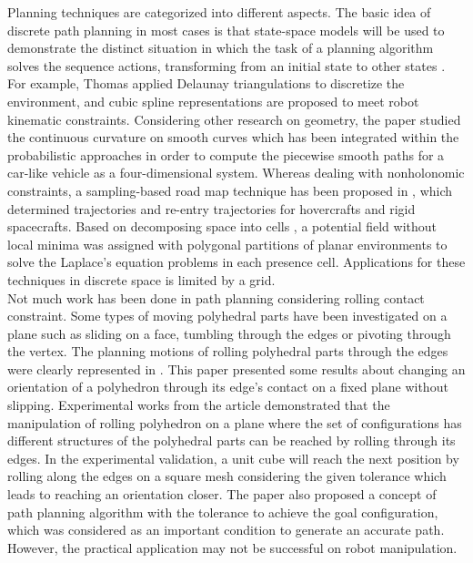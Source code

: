 \noindent Planning techniques are categorized into different aspects. 
The basic idea of discrete path planning in most cases is that state-space models will be used to demonstrate the distinct situation in which the task of a planning algorithm solves the sequence actions, transforming from an initial state to other states \cite{Lavalle98rapidly_exploringrandom}. 
For example, Thomas \cite{Thomas_2003_Trajectory} applied Delaunay triangulations to discretize the environment, and cubic spline representations are proposed to meet robot kinematic constraints.
Considering other research on geometry, the paper \cite{Lamiraux_2001_Smooth_MP} studied the continuous curvature on smooth curves which has been integrated within the probabilistic approaches in order to compute the piecewise smooth paths for a car-like vehicle as a four-dimensional system. 
Whereas dealing with nonholonomic constraints, a sampling-based road map technique has been proposed in \cite{Cheng01_RRT-BasedTrajectory}, which determined trajectories and re-entry trajectories for hovercrafts and rigid spacecrafts. 
Based on decomposing space into cells \cite{Conner03_LocalFunction_Nagivation}, a potential field without local minima was assigned with polygonal partitions of planar environments to solve the Laplace’s equation problems in each presence cell. 
Applications for these techniques in discrete space is limited by a grid.\\

\noindent Not much work has been done in path planning considering rolling contact constraint. Some types of moving polyhedral parts have been investigated on a plane such as sliding on a face, tumbling through the edges or pivoting \cite{Aiyama93_Pivoting} through the vertex. 
The planning motions of rolling polyhedral parts through the edges were clearly represented in \cite{Marigo97_PolyhedraManipulation_rolling}. 
This paper presented some results about changing an orientation of a polyhedron through its edge's contact on a fixed plane without slipping.
Experimental works from the article demonstrated that the manipulation of rolling polyhedron on a plane where the set of configurations has different structures of the polyhedral parts can be reached by rolling through its edges. 
In the experimental validation, a unit cube will reach the next position by rolling  along the edges on a square mesh considering the given tolerance which leads to reaching an orientation closer. 
The paper also proposed a concept of path planning algorithm with the tolerance to achieve the goal configuration, which was considered as an important condition to generate an accurate path.
However, the practical application may not be successful on robot manipulation.\\

